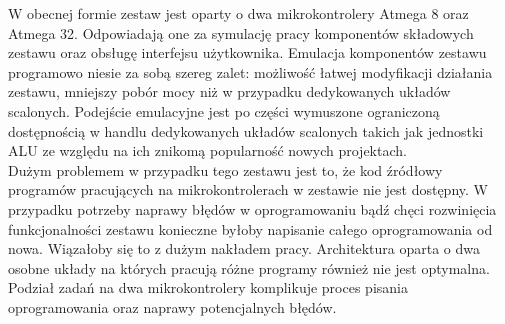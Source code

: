 \documentclass[../main.tex]{subfiles}
\begin{document}
    W obecnej formie zestaw jest oparty o dwa mikrokontrolery Atmega 8 oraz Atmega 32. Odpowiadają one za symulację pracy komponentów składowych zestawu
    oraz obsługę interfejsu użytkownika. Emulacja komponentów zestawu programowo niesie za sobą szereg zalet: możliwość łatwej modyfikacji
    działania zestawu, mniejszy pobór mocy niż w przypadku dedykowanych układów scalonych. Podejście emulacyjne jest po części wymuszone 
    ograniczoną dostępnością w handlu dedykowanych układów scalonych takich jak jednostki ALU ze względu na ich znikomą popularność nowych projektach.
    \\
    Dużym problemem w przypadku tego zestawu jest to, że kod źródłowy programów pracujących na mikrokontrolerach w zestawie nie jest dostępny. 
    W przypadku potrzeby naprawy błędów w oprogramowaniu bądź chęci rozwinięcia funkcjonalności zestawu konieczne byłoby napisanie
    całego oprogramowania od nowa. Wiązałoby się to z dużym nakładem pracy. Architektura oparta o dwa osobne układy na 
    których pracują różne programy również nie jest optymalna. Podział zadań na dwa mikrokontrolery komplikuje proces pisania oprogramowania oraz
    naprawy potencjalnych błędów.
\end{document}

